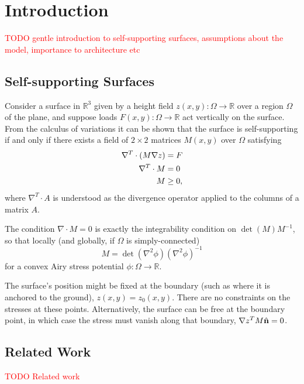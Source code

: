 \documentclass[annual]{acmsiggraph}
\newcommand{\todo}[1]{\textcolor{red}{#1}}
\begin{document}
\TOGlinkslist


\copyrightspace


\section{Introduction}

\todo{TODO gentle introduction to self-supporting surfaces, assumptions about the model, importance to architecture etc}

\subsection{Self-supporting Surfaces}
Consider a surface in $\mathbb{R}^3$ given by a height field $z(x,y): \Omega \to \mathbb{R}$ over a region $\Omega$ of the plane, and suppose loads $F(x,y): \Omega \to \mathbb{R}$ act vertically on the surface. From the calculus of variations it can be shown \cite{TODO} that the surface is self-supporting if and only if there exists a field of $2\times 2$ matrices $M(x,y)$ over $\Omega$ satisfying
\begin{align}
\nabla^T \cdot (M\nabla z) &= F  \label{eq:conds}\\
\nabla^T \cdot M &= 0 \notag \\
M &\geq 0, \notag
\end{align}
where $\nabla^T \cdot A$ is understood as the divergence operator applied to the columns of a matrix $A$.

The condition $\nabla \cdot M = 0$ is exactly the integrability condition on $\det(M) M^{-1}$, so that locally (and globally, if $\Omega$ is simply-connected) 
\begin{equation*}
M = \det(\nabla^2 \phi) (\nabla^2 \phi)^{-1}
\end{equation*}
for a convex Airy stress potential $\phi:\Omega \to \mathbb{R}$.

The surface's position might be fixed at the boundary (such as where it is anchored to the ground), $z(x,y) = z_0(x,y)$. There are no constraints on the stresses at these points. Alternatively, the surface can be free at the boundary point, in which case the stress must vanish along that boundary, $\nabla z^T M \hat{{\mathbf n}} = 0$.

\subsection{Related Work}
\todo{TODO Related work}
\end{document}

